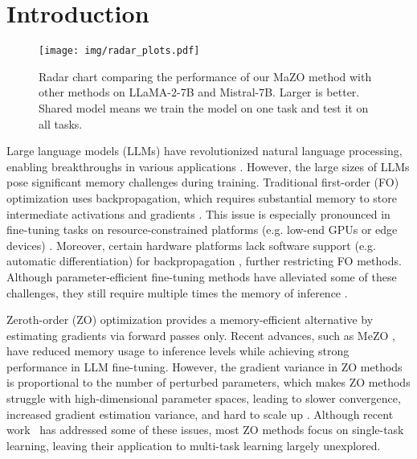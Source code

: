 \section{Introduction}
\begin{figure*}[t]
    \centering
    \vspace{-8pt} 
    \texttt{[image: img/radar\_plots.pdf]}
    \vspace{-8pt} 
    \caption{Radar chart comparing the performance of our MaZO method with other methods on LLaMA-2-7B and Mistral-7B. Larger is better. Shared model means we train the model on one task and test it on all tasks.}
    \vspace{-10pt} 
    \label{fig:radar}
\end{figure*}

Large language models (LLMs) have revolutionized natural language processing, enabling breakthroughs in various applications \citep{claude35sonnet,gemini20,gpt4o,bai2023qwen}. However, the large sizes of LLMs pose significant memory challenges during training. Traditional first-order (FO) optimization uses backpropagation, which requires substantial memory to store intermediate activations and gradients \citep{rostam2024achieving, kundu2024performance}. This issue is especially pronounced in fine-tuning tasks on resource-constrained platforms (e.g. low-end GPUs or edge devices) \citep{10.1145/3666025.3699355}. Moreover, certain hardware platforms lack software support (e.g. automatic differentiation) for backpropagation \citep{bergholm2018pennylane}, further restricting FO methods. Although parameter-efficient fine-tuning methods have alleviated some of these challenges, they still require multiple times the memory of inference \citep{bai2024beyond,zhang2024revisiting}.

Zeroth-order (ZO) optimization provides a memory-efficient alternative by estimating gradients via forward passes only. Recent advances, such as MeZO \citep{malladi2023mezo}, have reduced memory usage to inference levels while achieving strong performance in LLM fine-tuning. However, the gradient variance in ZO methods is proportional to the number of perturbed parameters, which makes ZO methods struggle with high-dimensional parameter spaces, leading to slower convergence, increased gradient estimation variance, and hard to scale up \citep{chen2024enhancing}. Although recent work~\citep{liu2024sparse, yang2024adazeta,chen2023deepzero, liu2024sparse, yu2024subzero} has addressed some of these issues, most ZO methods focus on single-task learning, leaving their application to multi-task learning largely unexplored.


